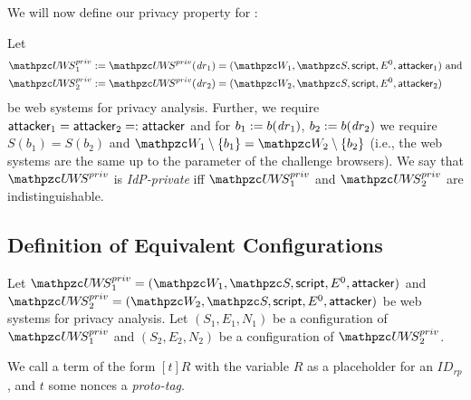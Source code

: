   We will now define our privacy property for \uppresso:
  
  \begin{definition}\label{def:idp-privacy}
    Let 
    \begin{align*}
      \uppressoprivwebsystem_1 := \uppressoprivwebsystem(\mi{dr}_1) =
      (\bidsystem_1, \scriptset, \mathsf{script}, E^0, \fAP{attacker}_1)&\text{ and}\\
      \uppressoprivwebsystem_2 := \uppressoprivwebsystem(\mi{dr}_2) =
      (\bidsystem_2, \scriptset, \mathsf{script}, E^0, \fAP{attacker}_2)&
    \end{align*}
    be \uppresso web systems for privacy analysis.  Further, we require
    $\mathsf{attacker}_1 = \mathsf{attacker}_2 =: \mathsf{attacker}$ and for $b_1
    := b(\mathit{dr}_1)$, $b_2 := b(\mathit{dr}_2)$ we require $S(b_1) = S(b_2)$
    and $\bidsystem_1 \setminus \{b_1\} = \bidsystem_2 \setminus
    \{b_2\}$ (i.e., the web systems are the same up to the parameter of
    the challenge browsers).  We say that $\uppressoprivwebsystem$ is
    \emph{IdP-private} iff $\uppressoprivwebsystem_1$ and
    $\uppressoprivwebsystem_2$ are indistinguishable.
  \end{definition}
  
  \subsection{Definition of Equivalent Configurations}\label{app:defin-equiv-stat}
  
  Let $\uppressoprivwebsystem_1 = (\bidsystem_1, \scriptset, \mathsf{script}, E^0, \fAP{attacker})$ 
  and $\uppressoprivwebsystem_2 = (\bidsystem_2, \scriptset, \mathsf{script}, E^0, \fAP{attacker})$ 
  be \uppresso web systems for privacy analysis. Let $(S_1,E_1,N_1)$ 
  be a configuration of $\uppressoprivwebsystem_1$ and $(S_2,E_2,N_2)$ 
  be a configuration of $\uppressoprivwebsystem_2$.
  
  \begin{definition}
    We call a term of the form $[t]R$ with the variable
    $R$ as a placeholder for an $ID_{rp}$, and $t$ some nonces a
    \emph{proto-tag}.
  \end{definition}
  
